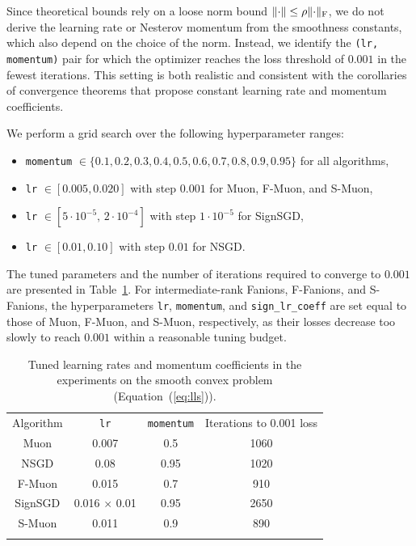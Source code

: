 \documentclass[smallextended,referee,envcountsect]{svjour3}
\newcommand{\norm}[1]{\lVert #1\rVert}
\DeclarePairedDelimiter{\normf}{\|}{\|_\mathrm{F}}
\newcommand{\tableref}[1]{Table~\ref{#1}}
\newcommand{\equationref}[1]{Equation~(\ref{#1})}
\begin{document}
 Since theoretical bounds \citep{kovalev2025understanding, riabinin2025gluon} rely on a loose norm bound $\norm{\cdot}\le \rho \normf{\cdot}$, we do not derive the learning rate or Nesterov momentum from the smoothness constants, which also depend on the choice of the norm. Instead, we identify the \texttt{(lr, momentum)} pair for which the optimizer reaches the loss threshold of $0.001$ in the fewest iterations. This setting is both realistic and consistent with the corollaries of convergence theorems that propose constant learning rate and momentum coefficients.
 
 We perform a grid search over the following hyperparameter ranges:
 \begin{itemize}
   \item \texttt{momentum} $\in \{0.1, 0.2, 0.3, 0.4, 0.5, 0.6, 0.7, 0.8, 0.9, 0.95\}$ for all algorithms,
   \item \texttt{lr} $\in [0.005, 0.020]$ with step $0.001$ for Muon, F-Muon, and S-Muon,
   \item \texttt{lr} $\in [5 \cdot 10^{-5},\, 2 \cdot 10^{-4}]$ with step $1 \cdot 10^{-5}$ for SignSGD,
   \item \texttt{lr} $\in [0.01, 0.10]$ with step $0.01$ for NSGD.
 \end{itemize}
 The tuned parameters and the number of iterations required to converge to $0.001$ are presented in \tableref{tbl:lls_lrs}. For intermediate-rank Fanions, F-Fanions, and S-Fanions, the hyperparameters \texttt{lr}, \texttt{momentum}, and \texttt{sign\_lr\_coeff} are set equal to those of Muon, F-Muon, and S-Muon, respectively, as their losses decrease too slowly to reach $0.001$ within a reasonable tuning budget.
 
 \begin{table}[htbp]
 
\caption{Tuned learning rates and momentum coefficients in the experiments on the smooth convex problem (\equationref{eq:lls}).}\label{tbl:lls_lrs}
%
     \begin{tabular}{cccc}
       \arrayrulecolor{black}\toprule
       Algorithm & \texttt{lr}  & \texttt{momentum}  & Iterations to 0.001 loss \\
       \arrayrulecolor{black}\hline
       Muon & 0.007 & 0.5 & 1060 \\
       \hdashline
       NSGD & 0.08 & 0.95 & 1020 \\
       F-Muon & 0.015 & 0.7 & 910 \\
       \hdashline
       SignSGD & 0.016 $\times$ 0.01 & 0.95 & 2650 \\
       S-Muon & 0.011 & 0.9 & 890 \\
       \arrayrulecolor{black}\bottomrule
     \end{tabular}%
   

 \end{table}
 
\end{document}
